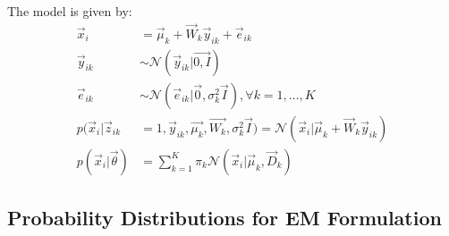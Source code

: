 \documentclass[12pt,twoside]{article}
\begin{document}
The model is given by:
\begin{align*}
	\vec{x}_i &= \vec{\mu}_k + \vec{W}_k\vec{y}_{ik} + \vec{e}_{ik}\\
	\vec{y}_{ik} &\sim \mathcal{N} (\vec{y}_{ik}\vert \vec{0,I})\\
	\vec{e}_{ik} & \sim \mathcal{N} (\vec{e}_{ik}\vert \vec{0},\sigma^2_k\vec{I}), \forall k = 1,\dots, K\\
	p(\vec{x}_i\vert  \vec{z}_{ik} &=1, \vec{y}_{ik}, \vec{\mu_k}, \vec{W_k}, \sigma^2_k \vec{I}) = \mathcal{N}(\vec{x}_i \vert \vec{\mu}_k + \vec{W}_k\vec{y}_{ik})\\
	p(\vec{x}_i\vert \vec{\theta})& = \sum_{k=1}^K \pi_k \mathcal{N}(\vec{x}_i \vert \vec{\mu}_k, \vec{D}_k)
\end{align*}


\subsection{Probability Distributions for EM Formulation}
\end{document}
